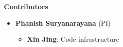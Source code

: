  \begin{frame}[allowframebreaks]{\textbf{Contributors}} \label{Contributors}

	\begin{itemize}
	\item \textbf{Phanish Suryanarayana} (PI)
	\begin{itemize}   
        \item \textbf{Xin Jing}: Code infrastructure \\  
 	\end{itemize}
 	\end{itemize}
  
\end{frame}



